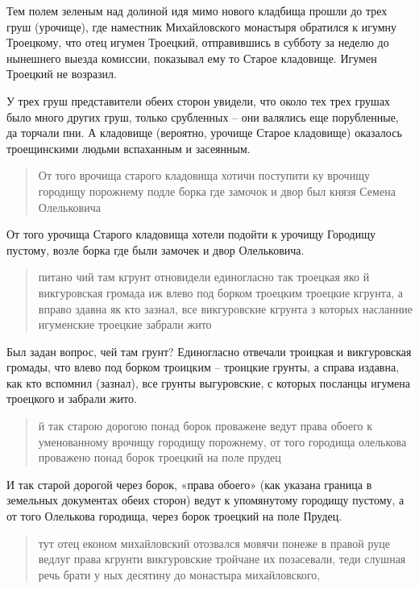 Тем полем зеленым над долиной идя мимо нового кладбища прошли до трех груш (урочище), где наместник Михайловского монастыря обратился к игумну Троецкому, что отец игумен Троецкий, отправившись в субботу за неделю до нынешнего выезда комиссии, показывал ему то Старое кладовище. Игумен Троецкий не возразил.

У трех груш представители обеих сторон увидели, что около тех трех грушах было много других груш, только срубленных – они валялись еще порубленные, да торчали пни. А кладовище (вероятно, урочище Старое кладовище) оказалось троещинскими людьми вспаханным и засеянным.

\begin{quotation}
От того врочища старого кладовища хотичи поступити ку врочищу городищу порожнему подле борка где замочок и двор был князя Семена Олельковича
\end{quotation}

От того урочища Старого кладовища хотели подойти к урочищу Городищу пустому, возле борка где были замочек и двор Олельковича.

\begin{quotation}
питано чий там кгрунт отновидели единогласно так троецкая яко й викгуровская громада иж влево под борком троецким троецкие кгрунта, а вправо здавна як кто зазнал, все викгуровские кгрунта з которых насланние игуменские троецкие забрали жито 
\end{quotation}

Был задан вопрос, чей там грунт? Единогласно отвечали троицкая и викгуровская громады, что влево под борком троицким – троицкие грунты, а справа издавна, как кто вспомнил (зазнал), все грунты выгуровские, с которых посланцы игумена троецкого и забрали жито. 

\begin{quotation}
й так старою дорогою понад борок проважене ведут права обоего к уменованному врочищу городищу порожнему, от того городища олелькова проважено понад борок троецкий на поле прудец 
\end{quotation}

И так старой дорогой через борок, «права обоего» (как указана граница в земельных документах обеих сторон) ведут к упомянутому городищу пустому, а от того Олелькова городища, через борок троецкий на поле Прудец.

\begin{quotation}
тут отец економ михайловский отозвался мовячи понеже в правой руце ведлуг права кгрунти викгуровские тройчане их позасевали, теди слушная речь брати у ных десятину до монастыра михайловского, 
\end{quotation}

